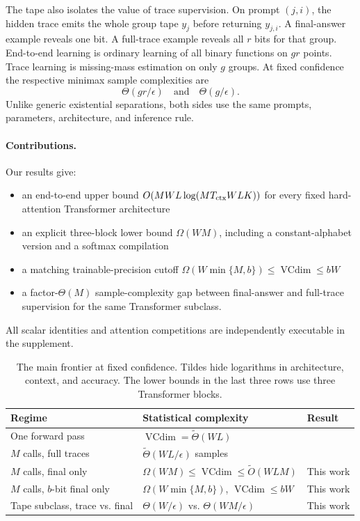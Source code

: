 \documentclass{article}
\newcommand{\1}{\mathbf 1}
\newcommand{\VC}{\operatorname{VCdim}}
\begin{document}
The tape also isolates the value of trace supervision. On prompt $(j,i)$, the hidden trace emits the whole group tape $y_j$ before returning $y_{j,i}$. A final-answer example reveals one bit. A full-trace example reveals all $r$ bits for that group. End-to-end learning is ordinary learning of all binary functions on $gr$ points. Trace learning is missing-mass estimation on only $g$ groups. At fixed confidence the respective minimax sample complexities are
\begin{equation}
 \Theta(gr/\epsilon)
 \quad\text{and}\quad
 \Theta(g/\epsilon).
 \label{eq:intro-gap}
\end{equation}
Unlike generic existential separations, both sides use the same prompts, parameters, architecture, and inference rule.

\paragraph{Contributions.}
Our results give:
\begin{itemize}[leftmargin=*,itemsep=2pt,topsep=2pt]
 \item an end-to-end upper bound $O(MWL\log(MT_{\rm ctx}WLK))$ for every fixed
hard-attention Transformer architecture
 \item an explicit three-block lower bound $\Omega(WM)$, including a constant-alphabet version
and a softmax compilation
 \item a matching trainable-precision cutoff $\Omega(W\min\{M,b\})\leq
\VC\leq bW$
 \item a factor-$\Theta(M)$ sample-complexity gap between final-answer and full-trace supervision
for the same Transformer subclass.
\end{itemize}
All scalar identities and attention competitions are independently executable in the supplement.

\begin{table}[t]
\centering
\small \setlength{\tabcolsep}{5pt}
\begin{tabular}{lll}
\toprule
Regime & Statistical complexity & Result\\
\midrule
One forward pass & $\VC=\widetilde\Theta(WL)$ & \citet{yang2026tight}\\
$M$ calls, full traces & $\widetilde\Theta(WL/\epsilon)$ samples & \citet{yang2026tight}\\
$M$ calls, final only & $\Omega(WM)\leq\VC\leq\widetilde O(WLM)$ & This work\\
$M$ calls, $b$-bit final only & $\Omega(W\min\{M,b\})$, $\VC\leq bW$ & This work\\
Tape subclass, trace vs. final & $\Theta(W/\epsilon)$ vs. $\Theta(WM/\epsilon)$ & This work\\
\bottomrule
\end{tabular}
\caption{The main frontier at fixed confidence. Tildes hide logarithms in architecture, context,
and accuracy. The lower bounds in the last three rows use three Transformer blocks.}
\label{tab:frontier}
\end{table}
\end{document}
